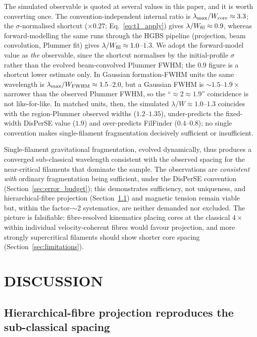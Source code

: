 \documentclass[usenatbib,twoside,twocolumn]{mnras}
\begin{document}
The simulated observable is quoted at several values in this paper, and it is worth converting once. The convention-independent internal ratio is $\lambda_{\rm max}/W_{\rm core}\approx3.3$; the $\sigma$-normalised shortcut ($\times0.27$; Eq.~\ref{eq:t1_apply}) gives $\lambda/W_{\rm fil}\approx0.9$, whereas forward-modelling the same runs through the HGBS pipeline (projection, beam convolution, Plummer fit) gives $\lambda/W_{\rm fil}\approx1.0$--$1.3$. We adopt the forward-model value as \emph{the} observable, since the shortcut normalises by the initial-profile $\sigma$ rather than the evolved beam-convolved Plummer FWHM; the $0.9$ figure is a shortcut lower estimate only. In Gaussian formation-FWHM units the same wavelength is $\lambda_{\rm max}/W_{\rm FWHM}\approx1.5$--$2.0$, but a Gaussian FWHM is $\sim1.5$--$1.9\times$ narrower than the observed Plummer FWHM, so the ``$\approx2\approx1.9$'' coincidence is not like-for-like. In matched units, then, the simulated $\lambda/W\approx1.0$--$1.3$ coincides with the region-Plummer observed widths ($1.2$--$1.35$), under-predicts the fixed-width DisPerSE value ($1.9$) and over-predicts FilFinder ($0.4$--$0.8$); no single convention makes single-filament fragmentation decisively sufficient or insufficient.

Single-filament gravitational fragmentation, evolved dynamically, thus produces a converged sub-classical wavelength consistent with the observed spacing for the near-critical filaments that dominate the sample. The observations are \emph{consistent with} ordinary fragmentation being sufficient, under the DisPerSE convention (Section~\ref{sec:error_budget}); this demonstrates sufficiency, not uniqueness, and hierarchical-fibre projection (Section~\ref{sec:fibre_projection}) and magnetic tension remain viable but, within the factor-$\sim$2 systematics, are neither demanded nor excluded. The picture is falsifiable: fibre-resolved kinematics placing cores at the classical $4\times$ within individual velocity-coherent fibres would favour projection, and more strongly supercritical filaments should show shorter core spacing (Section~\ref{sec:limitations}).

\section{DISCUSSION}
\label{sec:discussion}

\subsection{Hierarchical-fibre projection reproduces the sub-classical spacing}
\label{sec:fibre_projection}
\end{document}
